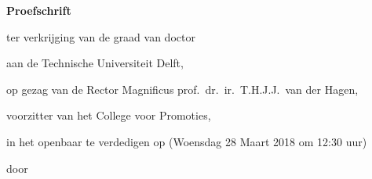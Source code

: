 \begin{titlepage}

\begin{center}

\vspace*{2\bigskipamount}

{\makeatletter
\titlestyle\bfseries\LARGE\@title
\makeatother}

{\makeatletter
\ifx\@subtitle\undefined\else
    \bigskip
    \titlefont\titleshape\Large\@subtitle
\fi
\makeatother}

\end{center}

\cleardoublepage
\thispagestyle{empty}

\begin{center}


\vspace*{2\bigskipamount}

{\makeatletter
\titlestyle\bfseries\LARGE\@title
\makeatother}

{\makeatletter
\ifx\@subtitle\undefined\else
    \bigskip
    \titlefont\titleshape\Large\@subtitle
\fi
\makeatother}

\vfill


{\Large\titlefont\bfseries Proefschrift}

\bigskip
\bigskip

ter verkrijging van de graad van doctor

aan de Technische Universiteit Delft,

op gezag van de Rector Magnificus prof.~dr.~ir.~T.H.J.J.~van der Hagen,

voorzitter van het College voor Promoties,

in het openbaar te verdedigen op (Woensdag 28 Maart 2018 om 12:30 uur)

\bigskip
\bigskip

door

\bigskip
\bigskip


\end{center}
\end{titlepage}
